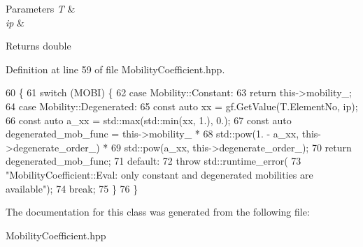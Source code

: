 \begin{DoxyParams}{Parameters}
{\em T} & \\
\hline
{\em ip} & \\
\hline
\end{DoxyParams}
\begin{DoxyReturn}{Returns}
double 
\end{DoxyReturn}


Definition at line 59 of file Mobility\+Coefficient.\+hpp.


\begin{DoxyCode}
60                                                                        \{
61   \textcolor{keywordflow}{switch} (MOBI) \{
62     \textcolor{keywordflow}{case} Mobility::Constant:
63       \textcolor{keywordflow}{return} this->mobility\_;
64     \textcolor{keywordflow}{case} Mobility::Degenerated:
65       \textcolor{keyword}{const} \textcolor{keyword}{auto} xx = gf.GetValue(T.ElementNo, ip);
66       \textcolor{keyword}{const} \textcolor{keyword}{auto} a\_xx = std::max(std::min(xx, 1.), 0.);
67       \textcolor{keyword}{const} \textcolor{keyword}{auto} degenerated\_mob\_func = this->mobility\_ *
68                                         std::pow(1. - a\_xx, this->degenerate\_order\_) *
69                                         std::pow(a\_xx, this->degenerate\_order\_);
70       \textcolor{keywordflow}{return} degenerated\_mob\_func;
71     \textcolor{keywordflow}{default}:
72       \textcolor{keywordflow}{throw} std::runtime\_error(
73           \textcolor{stringliteral}{"MobilityCoefficient::Eval: only constant and degenerated mobilities  are available"});
74       \textcolor{keywordflow}{break};
75   \}
76 \}
\end{DoxyCode}


The documentation for this class was generated from the following file\+:\begin{DoxyCompactItemize}
\item 
Mobility\+Coefficient.\+hpp\end{DoxyCompactItemize}
